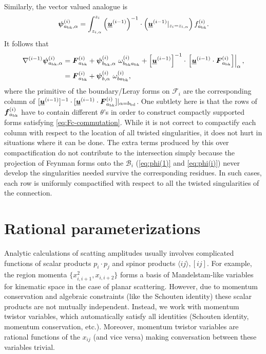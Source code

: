 \documentclass[11pt]{article}
\newcommand{\nn}{\nonumber}
\newcommand{\be}{\begin{equation}}
\newcommand{\ee}{\end{equation}}
\newcommand{\la}{\langle}
\newcommand{\ra}{\rangle}
\newcommand{\F}{\mathcal{F}}
\newcommand{\B}{\mathcal{B}}
\newcommand{\bk}{{\rm bk}}
\newcommand{\bd}{{\rm bd}}
\newcommand{\bs}[1]{\boldsymbol{#1}}
\newcommand{\mat}[1]{\underline{\boldsymbol{#1}}}
\begin{document}
Similarly, the vector valued analogue is 
\be
\bs{\psi}^{(i)}_{{a_\bk},\alpha} 
	= \int_{z_{i,\alpha}}^{z_i} \left(\mat{u}^{(i-1)}\right)^{-1} 
		\cdot \left(\mat{u}^{(i-1)}\vert_{z_i=z_{i,\alpha}}\right) f_{a_\bk}^{(i)}.
\ee
It follows that
\begin{align}
	\nabla^{(i-1)}\bs{\psi}^{(i)}_{a_\bk,\alpha}
	&= \bs{F}^{(i)}_{a_\bk} 
		+ \bs{\psi}^{(i)}_{b_\bk,\alpha}\ \omega^{(i)}_{b_\bk a_\bk} 
		+ \left[\mat{u}^{(i-1)}\right]^{-1} \cdot 
		\left.\left[
			\mat{u}^{(i-1)} \cdot \bs{F}^{(i)}_{a_\bk}
		\right]\right\vert_\alpha,
	\nn\\
	&= \bs{F}^{(i)}_{a_\bk} 
		+ \bs{\psi}^{(i)}_{b,\alpha}\ \omega^{(i)}_{b a_\bk}, 
\end{align}
where the primitive of the boundary/Leray forms on $\F_i$ are the corresponding column of $[\mat{u}^{(i-1)}]^{-1} \cdot [\mat{u}^{(i-1)} \cdot \bs{F}^{(i)}_{a_\bk}]\vert_{\alpha = b_\bd}$. 
One subtlety here is that the rows of $\bs{f}^{(i)}_{a_\bk}$ have to contain different $\theta$'s in order to construct compactly supported forms satisfying \eqref{eq:Fc-commutation}. 
While it is not correct to compactify each column with respect to the location of all twisted singularities, it does not hurt in situations where it can be done.
The extra terms produced by this over compactification do not contribute to the intersection simply because the projection of Feynman forms onto the $\B_i$ (\eqref{eq:phi(1)} and \eqref{eq:phi(i)}) never develop the singularities needed survive the corresponding residues. 
In such cases, each row is uniformly compactified with respect to all the twisted singularities of the connection.


\section{Rational parameterizations \label{app:ratparm} }

Analytic calculations of scatting amplitudes usually involves complicated functions of scalar products $p_i\cdot p_j$ and spinor products $\la ij \ra, [ij]$. For example, the region momenta $\{x_{i,i+1}^2, x_{i,i+2}\}$ forms a basis of Mandelstam-like variables for kinematic space in the case of planar scattering. However, due to momentum conservation and algebraic constraints (like the Schouten identity) these scalar products are not mutually independent. Instead, we work with momentum twistor variables, which automatically satisfy all identities (Schouten identity, momentum conservation, etc.). Moreover, momentum twistor variables are rational functions of the $x_{ij}$ (and vice versa) making conversation between these variables trivial. 
\end{document}
